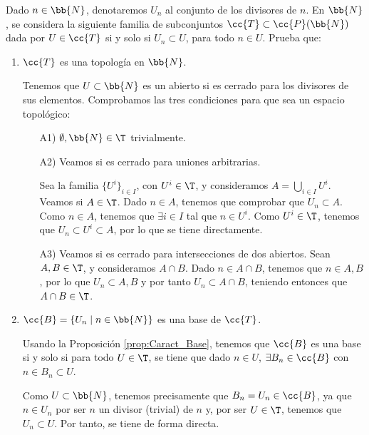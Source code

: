 \begin{ejercicio}\label{ej:3.1.10}
    Dado $n\in \bb{N}$, denotaremos $U_n$ al conjunto de los divisores de $n$. En $\bb{N}$, se considera la siguiente familia de subconjuntos $\cc{T}\subset \cc{P}(\bb{N})$ dada por $U\in \cc{T}$ si y solo si $U_n\subset U$, para todo $n\in U$. Prueba que:
    \begin{enumerate}[label=\alph*)]
        \item $\cc{T}$ es una topología en $\bb{N}$.

        Tenemos que $U\subset \bb{N}$ es un abierto si es cerrado para los divisores de sus elementos. Comprobamos las tres condiciones para que sea un espacio topológico:
        \begin{enumerate}[label=\alph*)]
            \item[A1)] $\emptyset,\bb{N} \in \T$ trivialmente.
            
            \item[A2)] Veamos si es cerrado para uniones arbitrarias.

            Sea la familia $\{U^i\}_{i\in I}$, con $U^i\in \T$, y consideramos $A=\bigcup\limits_{i\in I}U^i$. Veamos si $A\in \T$. Dado $n\in A$, tenemos que comprobar que $U_n\subset A$. Como $n\in A$, tenemos que $\exists i\in I$ tal que $n\in U^i$. Como $U^i\in \T$, tenemos que $U_n\subset U^i\subset A$, por lo que se tiene directamente.
    
            \item[A3)] Veamos si es cerrado para intersecciones de dos abiertos. Sean $A,B\in \T$, y consideramos $A\cap B$. Dado $n\in A\cap B$, tenemos que $n\in A,B$, por lo que $U_n\subset A,B$ y por tanto $U_n\subset A\cap B$, teniendo entonces que $A\cap B\in \T$.
        \end{enumerate}
    
        \item $\cc{B}=\{U_n\mid n\in \bb{N}\}$ es una base de $\cc{T}$.

        Usando la Proposición \ref{prop:Caract_Base}, tenemos que $\cc{B}$ es una base si y solo si para todo $U\in \T$, se tiene que dado $n\in U$, $\exists B_n\in \cc{B}$ con $n\in B_n\subset U$.

        Como $U\subset \bb{N}$, tenemos precisamente que $B_n=U_n\in \cc{B}$, ya que $n\in U_n$ por ser $n$ un divisor (trivial) de $n$ y, por ser $U\in \T$, tenemos que $U_n\subset U$. Por tanto, se tiene de forma directa.

        
    \end{enumerate}
\end{ejercicio}

